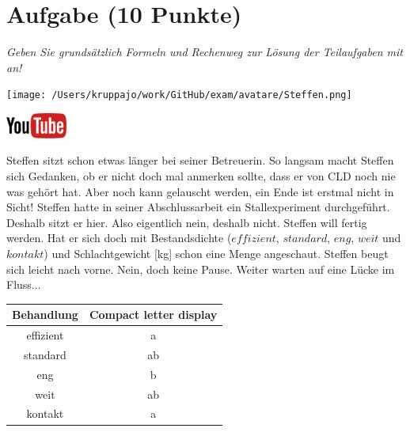 \documentclass[a4paper, 9pt]{scrartcl}\usepackage[]{graphicx}\usepackage[]{xcolor}
\newenvironment{knitrout}{}{} %
\begin{document}
 
\clearpage

\section{Aufgabe \hfill (10 Punkte)}

\textit{Geben Sie grundsätzlich Formeln und Rechenweg zur Lösung der Teilaufgaben mit an!} \\[1Ex]
 

 
\begin{minipage}[t]{0.5\textwidth}
\texttt{[image: /Users/kruppajo/work/GitHub/exam/avatare/Steffen.png]}
\end{minipage}
\begin{minipage}[t]{0.5\textwidth}
\hfill
\href{https://youtu.be/xq29O8qDrg0}{\includegraphics[width = 2cm]{img/youtube}}
\end{minipage}
\vspace{1ex}



Steffen sitzt schon etwas länger bei seiner Betreuerin. So langsam macht Steffen sich Gedanken, ob er nicht doch mal anmerken sollte, dass er von CLD noch nie was gehört hat. Aber noch kann gelauscht werden, ein Ende ist erstmal nicht in Sicht! Steffen hatte in seiner Abschlussarbeit ein Stallexperiment durchgeführt. Deshalb sitzt er hier. Also eigentlich nein, deshalb nicht. Steffen will fertig werden. Hat er sich doch mit Bestandsdichte ($effizient$, $standard$, $eng$, $weit$ und $kontakt$) und Schlachtgewicht [kg] schon eine Menge angeschaut. Steffen beugt sich leicht nach vorne. Nein, doch keine Pause. Weiter warten auf eine Lücke im Fluss...

\begin{knitrout}
\color{fgcolor}\begin{table}[!h]
\centering\begingroup\fontsize{10}{12}\selectfont

\begin{tabular}{cc}
\toprule
\textbf{Behandlung} & \textbf{Compact letter display}\\
\midrule
effizient & a\\
standard & ab\\
eng & b\\
weit & ab\\
kontakt & a\\
\bottomrule
\end{tabular}
\endgroup{}
\end{table}

\end{knitrout}
\end{document}
